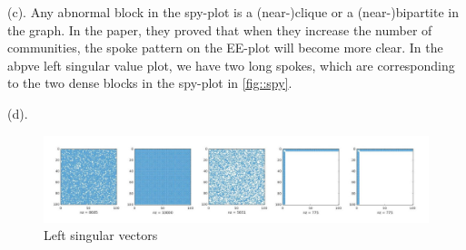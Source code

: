 \documentclass[11pt]{article}
\begin{document}
\noindent
(c).
Any abnormal block in the spy-plot is a (near-)clique or a (near-)bipartite in the graph. In the paper, they proved that when they increase the number of communities, the spoke pattern on the EE-plot will become more clear. In the abpve left singular value plot, we have two long spokes, which are corresponding to the two dense blocks in the spy-plot in \ref{fig::spy}.

\noindent
(d).
\begin{figure}[H]
    \centering
    \includegraphics[width=\linewidth]{figs/q3_d.jpg}
    \caption{Left singular vectors}
    \label{fig::sub}
\end{figure}
\end{document}
